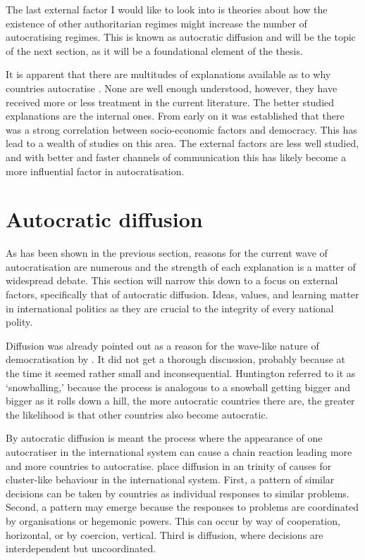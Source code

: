 The last external factor I would like to look into is theories about how the existence of other authoritarian regimes might increase the number of autocratising regimes. This is known as autocratic diffusion and will be the topic of the next section, as it will be a foundational element of the thesis.

It is apparent that there are multitudes of explanations available as to why countries autocratise \citep{berman_causes_2021}. None are well enough understood, however, they have received more or less treatment in the current literature. The better studied explanations are the internal ones. From early on it was established that there was a strong correlation between socio-economic factors and democracy. This has lead to a wealth of studies on this area. The external factors are less well studied, and with better and faster channels of communication this has likely become a more influential factor in autocratisation.

\section{Autocratic diffusion}
As has been shown in the previous section, reasons for the current wave of autocratisation are numerous and the strength of each explanation is a matter of widespread debate. This section will narrow this down to a focus on external factors, specifically that of autocratic diffusion. Ideas, values, and learning matter in international politics as they are crucial to the integrity of every national polity.

Diffusion was already pointed out as a reason for the wave-like nature of democratisation by \citet{huntington_third_1991}. It did not get a thorough discussion, probably because at the time it seemed rather small and inconsequential. Huntington referred to it as `snowballing,' because the process is analogous to a snowball getting bigger and bigger as it rolls down a hill, the more autocratic countries there are, the greater the likelihood is that other countries also become autocratic.

By autocratic diffusion is meant the process where the appearance of one autocratiser in the international system can cause a chain reaction leading more and more countries to autocratise. \citet{elkins_waves_2005} place diffusion in an trinity of causes for cluster-like behaviour in the international system. First, a pattern of similar decisions can be taken by countries as individual responses to similar problems. Second, a pattern may emerge because the responses to problems are coordinated by organisations or hegemonic powers. This can occur by way of cooperation, horizontal, or by coercion, vertical. Third is diffusion, where decisions are interdependent but uncoordinated. 

